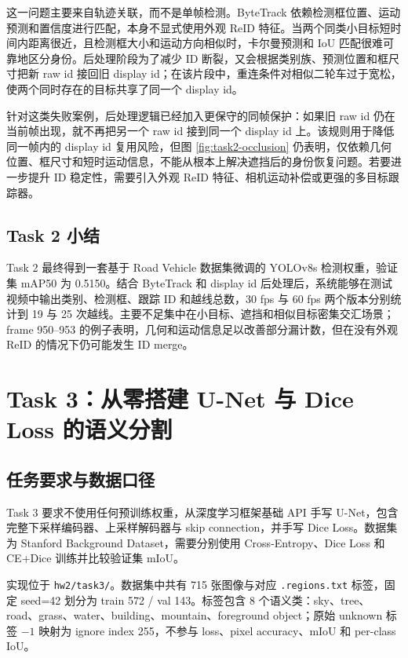 \documentclass[lang=cn,a4paper,newtx,code=minted]{elegantpaper}
\begin{document}
这一问题主要来自轨迹关联，而不是单帧检测。ByteTrack 依赖检测框位置、运动预测和置信度进行匹配，本身不显式使用外观 ReID 特征。当两个同类小目标短时间内距离很近，且检测框大小和运动方向相似时，卡尔曼预测和 IoU 匹配很难可靠地区分身份。后处理阶段为了减少 ID 断裂，又会根据类别族、预测位置和框尺寸把新 raw id 接回旧 display id；在该片段中，重连条件对相似二轮车过于宽松，使两个同时存在的目标共享了同一个 display id。

针对这类失败案例，后处理逻辑已经加入更保守的同帧保护：如果旧 raw id 仍在当前帧出现，就不再把另一个 raw id 接到同一个 display id 上。该规则用于降低同一帧内的 display id 复用风险，但图 \ref{fig:task2-occlusion} 仍表明，仅依赖几何位置、框尺寸和短时运动信息，不能从根本上解决遮挡后的身份恢复问题。若要进一步提升 ID 稳定性，需要引入外观 ReID 特征、相机运动补偿或更强的多目标跟踪器。

\subsection{Task 2 小结}

Task 2 最终得到一套基于 Road Vehicle 数据集微调的 YOLOv8s 检测权重，验证集 mAP50 为 0.5150。结合 ByteTrack 和 display id 后处理后，系统能够在测试视频中输出类别、检测框、跟踪 ID 和越线总数，30 fps 与 60 fps 两个版本分别统计到 19 与 25 次越线。主要不足集中在小目标、遮挡和相似目标密集交汇场景；frame 950--953 的例子表明，几何和运动信息足以改善部分漏计数，但在没有外观 ReID 的情况下仍可能发生 ID merge。

\section{Task 3：从零搭建 U-Net 与 Dice Loss 的语义分割}

\subsection{任务要求与数据口径}

Task 3 要求不使用任何预训练权重，从深度学习框架基础 API 手写 U-Net，包含完整下采样编码器、上采样解码器与 skip connection，并手写 Dice Loss。数据集为 Stanford Background Dataset，需要分别使用 Cross-Entropy、Dice Loss 和 CE+Dice 训练并比较验证集 mIoU。

实现位于 \texttt{hw2/task3/}。数据集中共有 715 张图像与对应 \texttt{.regions.txt} 标签，固定 seed=42 划分为 train 572 / val 143。标签包含 8 个语义类：sky、tree、road、grass、water、building、mountain、foreground object；原始 unknown 标签 $-1$ 映射为 ignore index 255，不参与 loss、pixel accuracy、mIoU 和 per-class IoU。
\end{document}

